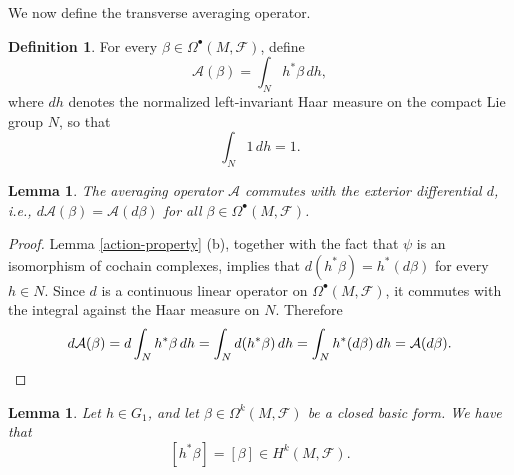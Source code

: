 \documentclass[reqno, 11pt]{amsart}
\newtheorem{lem}[thm]{Lemma}
\theoremstyle{definition}
\newtheorem{defn}[thm]{Definition}
\theoremstyle{property}
\theoremstyle{remark}
\numberwithin{equation}{section}
\begin{document}
We now define the transverse averaging operator.

\begin{defn}\label{t-a-operator}
For every $\beta\in \Omega^\bullet(M,\mathcal{F})$, define
\begin{equation}\label{a-operator}
\mathcal{A}(\beta)=\int_N h^*\beta\,dh,
\end{equation}
where $dh$ denotes the normalized left-invariant Haar measure on the compact
Lie group $N$, so that
\[
\int_N 1\,dh=1.
\]
\end{defn}

\begin{lem}\label{lem:avaraging-commutes-d}
The averaging operator $\mathcal{A}$ commutes with the exterior differential $d$,
i.e., $d\mathcal{A}(\beta) = \mathcal{A}(d\beta)$ for all $\beta \in \Omega^\bullet(M,\mathcal{F})$.
\end{lem}

\begin{proof}
Lemma \ref{action-property} (b), together with the fact that $\psi$ is an isomorphism of cochain complexes, implies that $d(h^*\beta) = h^*(d\beta)$ for every $h \in N$.
Since $d$ is a continuous linear operator on $\Omega^\bullet(M,\mathcal{F})$, it commutes
with the integral against the Haar measure on $N$. Therefore
\[
d\mathcal{A}(\beta) = d\int_N h^*\beta\, dh
= \int_N d(h^*\beta)\, dh
= \int_N h^*(d\beta)\, dh
= \mathcal{A}(d\beta). \qedhere
\]
\end{proof}




\begin{lem}\label{chain-homotopy}  Let $h \in G_1$, and let $\beta \in \Omega^k(M,\mathcal{F})$ be a closed basic form. We have that
\[ [h^*\beta]=[\beta] \in H^{k}(M, \mathcal{F}).\]
\end{lem}
\end{document}
